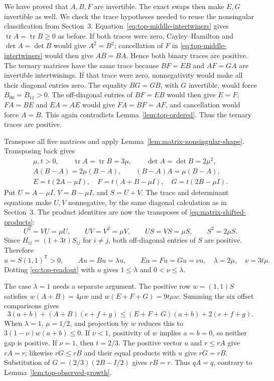 \documentclass[11pt,a4paper]{article}
\newcommand{\tr}{\operatorname{tr}}
\begin{document}
We have proved that $A,B,F$ are invertible. The exact swaps then
make $E,G$ invertible as well. We check the trace hypotheses needed
to reuse the nonsingular classification from Section~3.
Equation~\eqref{eq:top-middle-intertwiners} gives
$\tr A=\tr B\ge0$ as before. If both traces were zero,
Cayley--Hamilton and $\det A=\det B$ would give $A^2=B^2$;
cancellation of $F$ in \eqref{eq:top-middle-intertwiners} would then
give $AB=BA$. Hence both binary traces are positive.
The ternary matrices have the same trace because $BF=EB$ and
$AF=GA$ are invertible intertwinings. If that trace were zero,
nonnegativity would make all their diagonal entries zero.
The equality $BG=GB$, with $G$ invertible, would force
$B_{00}=B_{11}>0$.
The off-diagonal entries of $BF=EB$ would then give $E=F$;
$FA=BE$ and $EA=AE$ would give $FA=BF=AF$, and cancellation
would force $A=B$. This again contradicts
Lemma~\ref{lem:top-ordered}. Thus the ternary traces are positive.

Transpose all five matrices and apply
Lemma~\ref{lem:matrix-nonsingular-shape}. Transposing back gives
\begin{equation}\label{eq:top-nonsingular-shape}
\begin{gathered}
\mu,t>0,\qquad
\tr A=\tr B=3\mu,\qquad\det A=\det B=2\mu^2,\\
A(B-A)=2\mu(B-A),\qquad (B-A)A=\mu(B-A),\\
E=t(2A-\mu I),\quad F=t(A+B-\mu I),\quad G=t(2B-\mu I).
\end{gathered}
\end{equation}
Put $U=A-\mu I$, $V=B-\mu I$, and $S=U+V$.
The trace and determinant equations make $U,V$ nonnegative, by the
same diagonal calculation as in Section~3. The product identities
are now the transposes of \eqref{eq:matrix-shifted-products}:
\[
U^2=VU=\mu U,\qquad UV=V^2=\mu V,
\qquad US=VS=\mu S,\qquad S^2=2\mu S.
\]
Since $H_{ij}=(1+3t)S_{ij}$ for $i\ne j$, both off-diagonal
entries of $S$ are positive. Therefore
\[
u=S(1,1)^{\mathsf T}>0,\qquad
Au=Bu=\lambda u,\qquad Eu=Fu=Gu=\nu u,
\quad \lambda=2\mu,\quad\nu=3t\mu.
\]
Dotting \eqref{eq:top-readout} with $u$ gives
$1\le\lambda$ and $0<\nu\le\lambda$.

The case $\lambda=1$ needs a separate argument.
The positive row $w=(1,1)S$ satisfies
$w(A+B)=4\mu w$ and $w(E+F+G)=9t\mu w$.
Summing the six offset comparisons gives
\[
3(a+b)+(A+B)(e+f+g)
 \le(E+F+G)(a+b)+2(e+f+g).
\]
When $\lambda=1$, $\mu=1/2$, and projection by $w$ reduces this to
$3(1-\nu)w(a+b)\le0$. If $\nu<1$, positivity of $w$ implies
$a=b=0$, so neither gap is positive.
If $\nu=1$, then $t=2/3$. The positive vector $u$ and
$r\le rA$ give $rA=r$; likewise $rG\le rB$ and their equal
products with $u$ give $rG=rB$. Substitution of
$G=(2/3)(2B-I/2)$ gives $rB=r$.
Thus $qA=q$, contrary to Lemma~\ref{lem:top-observed-growth}.
\end{document}

